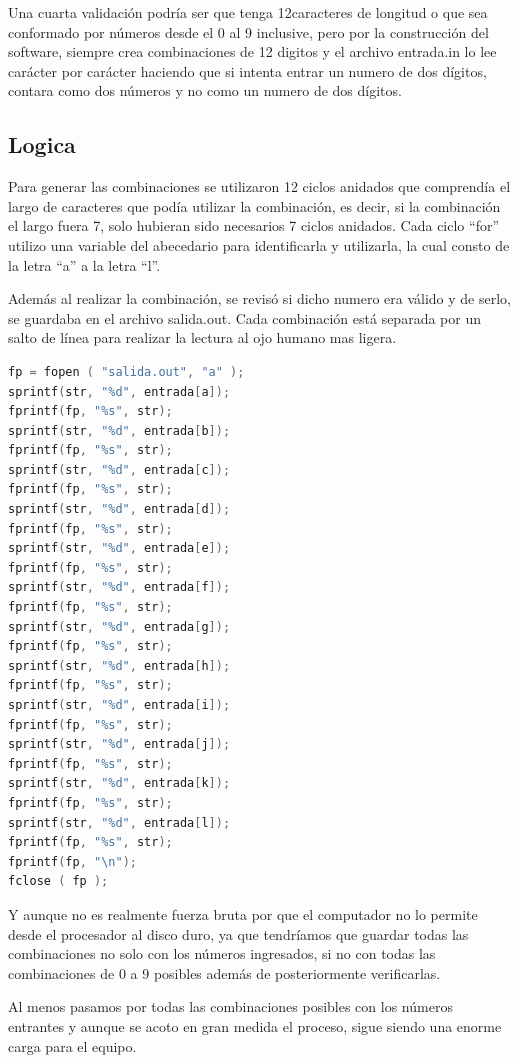\documentclass[9pt,twocolumn,twoside]{optica}
\begin{document}
Una cuarta validación podría ser que tenga 12caracteres de longitud o que sea conformado por números desde el 0 al 9 inclusive, pero por la construcción del software, siempre crea combinaciones de 12 digitos y el archivo entrada.in lo lee carácter por carácter haciendo que si intenta entrar un numero de dos dígitos, contara como dos números y no como un numero de dos dígitos.

\subsection{Logica}
Para generar las combinaciones se utilizaron 12 ciclos anidados que comprendía el largo de caracteres que podía utilizar la combinación, es decir, si la combinación el largo fuera 7, solo hubieran sido necesarios 7 ciclos anidados. Cada ciclo “for” utilizo una variable del abecedario para identificarla y utilizarla, la cual consto de la letra “a” a la letra “l”.

Además al realizar la combinación, se revisó si dicho numero era válido y de serlo, se guardaba en el archivo salida.out. Cada combinación está separada por un salto de línea para realizar la lectura al ojo humano mas ligera.

\begin{lstlisting}[language=C]
fp = fopen ( "salida.out", "a" );
sprintf(str, "%d", entrada[a]);
fprintf(fp, "%s", str);
sprintf(str, "%d", entrada[b]);
fprintf(fp, "%s", str);
sprintf(str, "%d", entrada[c]);
fprintf(fp, "%s", str);
sprintf(str, "%d", entrada[d]);
fprintf(fp, "%s", str);
sprintf(str, "%d", entrada[e]);
fprintf(fp, "%s", str);
sprintf(str, "%d", entrada[f]);
fprintf(fp, "%s", str);
sprintf(str, "%d", entrada[g]);
fprintf(fp, "%s", str);
sprintf(str, "%d", entrada[h]);
fprintf(fp, "%s", str);
sprintf(str, "%d", entrada[i]);
fprintf(fp, "%s", str);
sprintf(str, "%d", entrada[j]);
fprintf(fp, "%s", str);
sprintf(str, "%d", entrada[k]);
fprintf(fp, "%s", str);
sprintf(str, "%d", entrada[l]);
fprintf(fp, "%s", str);
fprintf(fp, "\n");
fclose ( fp );
\end{lstlisting}

Y aunque no es realmente fuerza bruta por que el computador no lo permite desde el procesador al disco duro, ya que tendríamos que guardar todas las combinaciones no solo con los números ingresados, si no con todas las combinaciones de 0 a 9 posibles además de posteriormente verificarlas. 

Al menos pasamos por todas las combinaciones posibles con los números entrantes y aunque se acoto en gran medida el proceso, sigue siendo una enorme carga para el equipo. 
\end{document}
